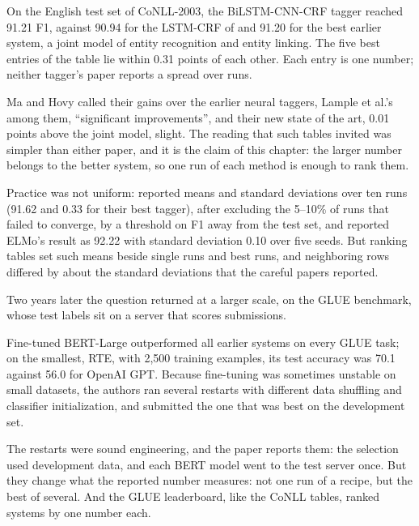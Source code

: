 \begin{refsection}
\begin{finding}\label{fd:seeds:ner}
On the English test set of CoNLL-2003, the BiLSTM-CNN-CRF tagger reached 91.21 F1, against 90.94 for the LSTM-CRF of \textcite{LampleEtAl2016} and 91.20 for the best earlier system, a joint model of entity recognition and entity linking. The five best entries of the table lie within 0.31 points of each other. Each entry is one number; neither tagger's paper reports a spread over runs.
\end{finding}

Ma and Hovy called their gains over the earlier neural taggers, Lample et al.'s among them, ``significant improvements'', and their new state of the art, 0.01 points above the joint model, slight. The reading that such tables invited was simpler than either paper, and it is the claim of this chapter: the larger number belongs to the better system, so one run of each method is enough to rank them.

Practice was not uniform: \textcite{ChiuNichols2016} reported means and standard deviations over ten runs (91.62 and 0.33 for their best tagger), after excluding the 5--10\% of runs that failed to converge, by a threshold on F1 away from the test set, and \textcite{PetersEtAl2018} reported ELMo's result as 92.22 with standard deviation 0.10 over five seeds. But ranking tables set such means beside single runs and best runs, and neighboring rows differed by about the standard deviations that the careful papers reported.

Two years later the question returned at a larger scale, on the GLUE benchmark, whose test labels sit on a server that scores submissions.

\begin{finding}\label{fd:seeds:bert}
Fine-tuned BERT-Large outperformed all earlier systems on every GLUE task; on the smallest, RTE, with 2,500 training examples, its test accuracy was 70.1 against 56.0 for OpenAI GPT. Because fine-tuning was sometimes unstable on small datasets, the authors ran several restarts with different data shuffling and classifier initialization, and submitted the one that was best on the development set.
\end{finding}

The restarts were sound engineering, and the paper reports them: the selection used development data, and each BERT model went to the test server once. But they change what the reported number measures: not one run of a recipe, but the best of several. And the GLUE leaderboard, like the CoNLL tables, ranked systems by one number each.


\end{refsection}
